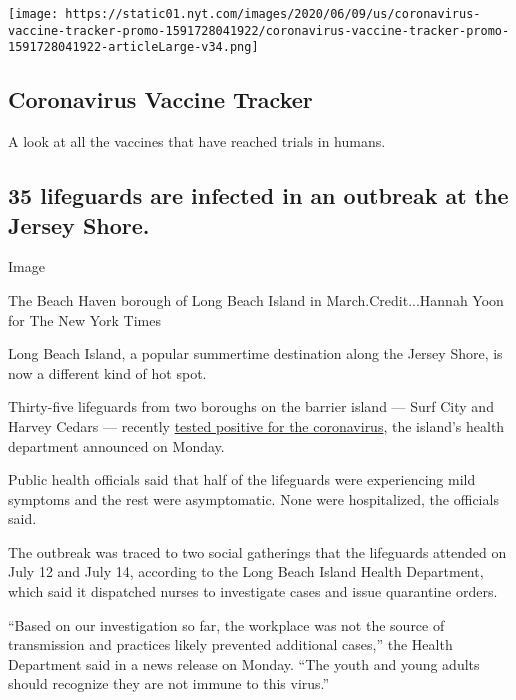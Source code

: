 \href{https://www.nytimes.com/interactive/2020/science/coronavirus-vaccine-tracker.html}{}

\texttt{[image: https://static01.nyt.com/images/2020/06/09/us/coronavirus-vaccine-tracker-promo-1591728041922/coronavirus-vaccine-tracker-promo-1591728041922-articleLarge-v34.png]}

\hypertarget{coronavirus-vaccine-tracker}{%
\subsection{Coronavirus Vaccine
Tracker}\label{coronavirus-vaccine-tracker}}

A look at all the vaccines that have reached trials in humans.

\hypertarget{35-lifeguards-are-infected-in-an-outbreak-at-the-jersey-shore}{%
\subsection{35 lifeguards are infected in an outbreak at the Jersey
Shore.}\label{35-lifeguards-are-infected-in-an-outbreak-at-the-jersey-shore}}

Image

The Beach Haven borough of Long Beach Island in March.Credit...Hannah
Yoon for The New York Times

Long Beach Island, a popular summertime destination along the Jersey
Shore, is now a different kind of hot spot.

Thirty-five lifeguards from two boroughs on the barrier island --- Surf
City and Harvey Cedars --- recently
\href{http://lbihealth.com/wp-content/uploads/2020/07/pressrelease727.pdf}{tested
positive for the coronavirus}, the island's health department announced
on Monday.

Public health officials said that half of the lifeguards were
experiencing mild symptoms and the rest were asymptomatic. None were
hospitalized, the officials said.

The outbreak was traced to two social gatherings that the lifeguards
attended on July 12 and July 14, according to the Long Beach Island
Health Department, which said it dispatched nurses to investigate cases
and issue quarantine orders.

``Based on our investigation so far, the workplace was not the source of
transmission and practices likely prevented additional cases,'' the
Health Department said in a news release on Monday. ``The youth and
young adults should recognize they are not immune to this virus.''

